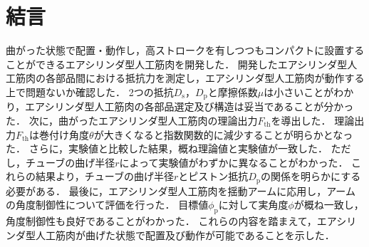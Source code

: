 \section{結言}%
曲がった状態で配置・動作し，高ストロークを有しつつもコンパクトに設置することができるエアシリンダ型人工筋肉を開発した．
開発したエアシリンダ型人工筋肉の各部品間における抵抗力を測定し，エアシリンダ型人工筋肉が動作する上で問題ないか確認した．
2つの抵抗$D_\mathrm{s}$，$D_\mathrm{p}$と摩擦係数$\mu$は小さいことがわかり，エアシリンダ型人工筋肉の各部品選定及び構造は妥当であることが分かった．
次に，曲がったエアシリンダ型人工筋肉の理論出力$F_\mathrm{th}$を導出した．
理論出力$F_\mathrm{th}$は巻付け角度$\theta$が大きくなると指数関数的に減少することが明らかとなった．
さらに，実験値と比較した結果，概ね理論値と実験値が一致した．
ただし，チューブの曲げ半径$r$によって実験値がわずかに異なることがわかった．
これらの結果より，チューブの曲げ半径$r$とピストン抵抗$D_\mathrm{p}$の関係を明らかにする必要がある．
最後に，エアシリンダ型人工筋肉を揺動アームに応用し，アームの角度制御性について評価を行った．
目標値$\phi_\mathrm{p}$に対して実角度$\phi$が概ね一致し，角度制御性も良好であることがわかった．
これらの内容を踏まえて，エアシリンダ型人工筋肉が曲げた状態で配置及び動作が可能であることを示した．